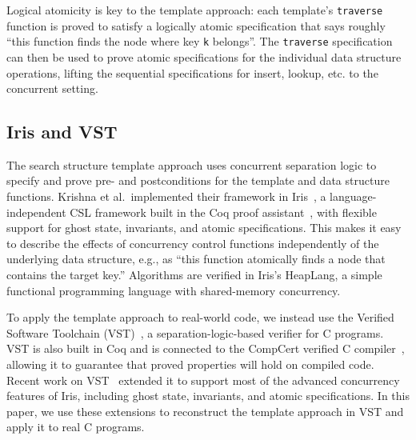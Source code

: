 \documentclass[sigplan,screen]{acmart}
\begin{document}
{Logical atomicity is key to the template approach: each template's \lstinline{traverse} function is proved to satisfy a logically atomic specification that says roughly ``this function finds the node where key \lstinline{k} belongs''. The \lstinline{traverse} specification can then be used to prove atomic specifications for the individual data structure operations, lifting the sequential specifications for insert, lookup, etc. to the concurrent setting.

\subsection{Iris and VST}
The search structure template approach uses concurrent separation logic to specify and prove pre- and postconditions for the template and data structure functions. Krishna et al.~implemented their framework in Iris~\cite{iris}, a language-independent CSL framework built in the Coq proof assistant~\cite{coq}, with flexible support for ghost state, invariants, and atomic specifications. This makes it easy to describe the effects of concurrency control functions independently of the underlying data structure, e.g., as ``this function atomically finds a node that contains the target key.'' %
Algorithms are verified in Iris's HeapLang, a simple functional programming language with shared-memory concurrency.

To apply the template approach to real-world code, we instead use the Verified Software Toolchain (VST)~\cite{plcc}, a separation-logic-based verifier for C programs. VST is also built in Coq and is connected to the CompCert verified C compiler~\cite{compcert}, allowing it to guarantee that proved properties will hold on compiled code. Recent work on VST~\cite{iris-vst-arxiv} extended it to support most of the advanced concurrency features of Iris, including ghost state, invariants, and atomic specifications. In this paper, we use these extensions to reconstruct the template approach in VST and apply it to real C programs. %
}
\end{document}
